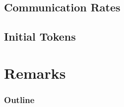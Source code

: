 \subsection{Communication Rates}

\subsection{Initial Tokens}



%
%
%
%
%
%
%


\section{Remarks}
\begin{frame}
  \frametitle{Outline}
\end{frame}


